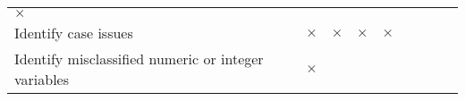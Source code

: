 \documentclass[]{report}
\begin{document}
\begin{longtable}[]{@{}lcccccccc@{}}
\begin{minipage}[t]{0.09\columnwidth}
\(\times\)\strut
\end{minipage} & \begin{minipage}[t]{0.06\columnwidth}\centering\strut
\strut
\end{minipage} & \begin{minipage}[t]{0.06\columnwidth}\centering\strut
\strut
\end{minipage} & \begin{minipage}[t]{0.05\columnwidth}\centering\strut
\strut
\end{minipage} & \begin{minipage}[t]{0.05\columnwidth}\centering\strut
\strut
\end{minipage}\tabularnewline
\begin{minipage}[t]{0.28\columnwidth}\raggedright\strut
Identify case issues\strut
\end{minipage} & \begin{minipage}[t]{0.06\columnwidth}\centering\strut
\(\times\)\strut
\end{minipage} & \begin{minipage}[t]{0.06\columnwidth}\centering\strut
\(\times\)\strut
\end{minipage} & \begin{minipage}[t]{0.06\columnwidth}\centering\strut
\(\times\)\strut
\end{minipage} & \begin{minipage}[t]{0.09\columnwidth}\centering\strut
\(\times\)\strut
\end{minipage} & \begin{minipage}[t]{0.06\columnwidth}\centering\strut
\strut
\end{minipage} & \begin{minipage}[t]{0.06\columnwidth}\centering\strut
\strut
\end{minipage} & \begin{minipage}[t]{0.05\columnwidth}\centering\strut
\strut
\end{minipage} & \begin{minipage}[t]{0.05\columnwidth}\centering\strut
\strut
\end{minipage}\tabularnewline
\begin{minipage}[t]{0.28\columnwidth}\raggedright\strut
Identify misclassified numeric or integer variables\strut
\end{minipage} & \begin{minipage}[t]{0.06\columnwidth}\centering\strut
\(\times\)\strut
\end{minipage} & \begin{minipage}[t]{0.06\columnwidth}\centering\strut

\end{minipage}
\end{longtable}
\end{document}
